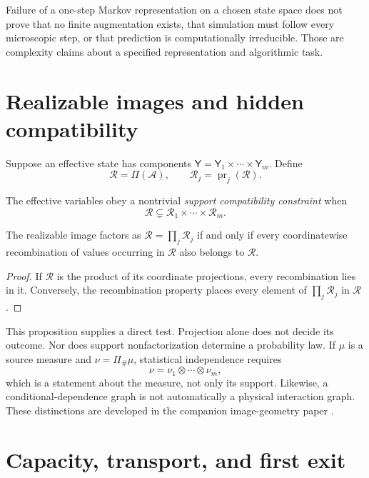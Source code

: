 \documentclass[11pt]{article}
\newcommand{\Y}{\mathsf Y}
\newcommand{\A}{\mathcal A}
\newcommand{\Rset}{\mathcal R}
\begin{document}
\begin{remark}
Failure of a one-step Markov representation on a chosen state space does
not prove that no finite augmentation exists, that simulation must follow
every microscopic step, or that prediction is computationally irreducible.
Those are complexity claims about a specified representation and algorithmic
task.
\end{remark}

\section{Realizable images and hidden compatibility}

Suppose an effective state has components
$\Y=\Y_1\times\cdots\times\Y_m$.  Define
\[
  \Rset=\Pi(\A),
  \qquad
  \Rset_j=\operatorname{pr}_j(\Rset).
\]

\begin{definition}
The effective variables obey a nontrivial \emph{support compatibility
constraint} when
\[
  \Rset\subsetneq\Rset_1\times\cdots\times\Rset_m.
\]
\end{definition}

\begin{proposition}
The realizable image factors as
$\Rset=\prod_j\Rset_j$ if and only if every coordinatewise recombination of
values occurring in $\Rset$ also belongs to $\Rset$.
\end{proposition}

\begin{proof}
If $\Rset$ is the product of its coordinate projections, every
recombination lies in it.  Conversely, the recombination property places
every element of $\prod_j\Rset_j$ in $\Rset$.
\end{proof}

This proposition supplies a direct test.  Projection alone does not decide
its outcome.  Nor does support nonfactorization determine a probability
law.  If $\mu$ is a source measure and $\nu=\Pi_\#\mu$, statistical
independence requires
\[
  \nu=\nu_1\otimes\cdots\otimes\nu_m,
\]
which is a statement about the measure, not only its support.  Likewise, a
conditional-dependence graph is not automatically a physical interaction
graph.  These distinctions are developed in the companion image-geometry
paper \cite{nero_network_image}.

\section{Capacity, transport, and first exit}
\end{document}
